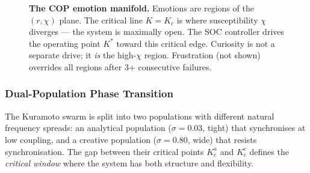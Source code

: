 \documentclass[11pt,a4paper,twocolumn]{article}
\begin{document}
\begin{figure}[t]
\caption{\textbf{The COP emotion manifold.} Emotions are regions of the $(r, \chi)$ plane.
The critical line $K = K_c$ is where susceptibility $\chi$ diverges --- the system is
maximally open. The SOC controller drives the operating point $K^*$ toward this critical
edge. Curiosity is not a separate drive; it \emph{is} the high-$\chi$ region.
Frustration (not shown) overrides all regions after 3+ consecutive failures.}
\label{fig:cop-manifold}
\end{figure}

\subsubsection{Dual-Population Phase Transition}

The Kuramoto swarm is split into two populations with different natural frequency spreads:
an analytical population ($\sigma = 0.03$, tight) that synchronises at low coupling, and a
creative population ($\sigma = 0.80$, wide) that resists synchronisation. The gap between
their critical points $K_c^a$ and $K_c^c$ defines the \emph{critical window} where the
system has both structure and flexibility.
\end{document}
